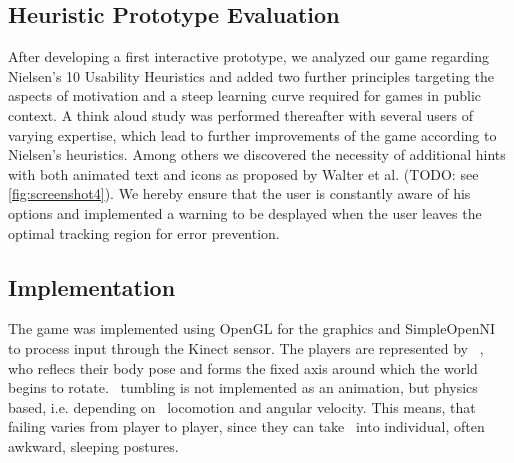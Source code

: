 \documentclass{chi-ext}
\begin{document}
\subsection{Heuristic Prototype Evaluation}
After developing a first interactive prototype, we  analyzed our game regarding Nielsen’s 10 Usability Heuristics \cite{nielsen1995usability} and added two further principles targeting the aspects of motivation and a steep learning curve required for games in public context.
%
A think aloud study was performed thereafter with several users of varying expertise, which lead to further improvements of the game according to Nielsen's heuristics. Among others we discovered the necessity of additional hints with both animated text and icons as proposed by Walter et al. \cite{walter2013strikeapose} (TODO: see \autoref{fig:screenshot4}). We hereby ensure that the user is constantly aware of his options and implemented a warning to be desplayed when the user leaves the optimal tracking region for error prevention.
\subsection{Implementation}
The game was implemented using OpenGL for the graphics and SimpleOpenNI to process input through the Kinect sensor. The players are represented by \ed\ , who reflecs their body pose and forms the fixed axis around which the world begins to rotate. \eds\ tumbling is not implemented as an animation, but physics based, i.e. depending on \eds\ locomotion and angular velocity. This means, that failing varies from player to player, since they can take \ed\ into individual, often awkward, sleeping postures.
\end{document}
